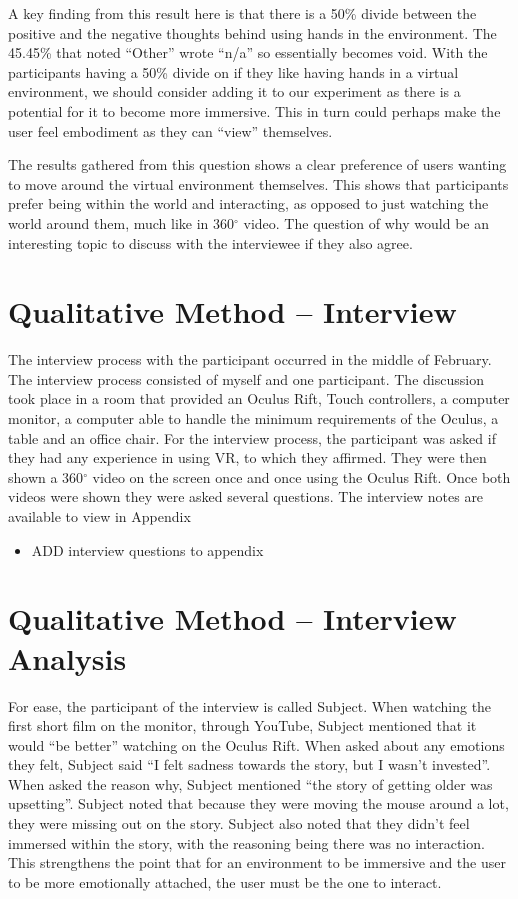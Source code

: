 \documentclass[12pt]{report}
\begin{document}
A key finding from this result here is that there is a 50\% divide between the positive and the negative thoughts behind using hands in the environment. The 45.45\% that noted “Other” wrote “n/a” so essentially becomes void. With the participants having a 50\% divide on if they like having hands in a virtual environment, we should consider adding it to our experiment as there is a potential for it to become more immersive. This in turn could perhaps make the user feel embodiment as they can “view” themselves.


 
 The results gathered from this question shows a clear preference of users wanting to move around the virtual environment themselves. This shows that participants prefer being within the world and interacting, as opposed to just watching the world around them, much like in 360${}^\circ$ video. The question of why would be an interesting topic to discuss with the interviewee if they also agree. 
 
\section{Qualitative Method – Interview} 
The interview process with the participant occurred in the middle of February. The interview process consisted of myself and one participant. The discussion took place in a room that provided an Oculus Rift, Touch controllers, a computer monitor, a computer able to handle the minimum requirements of the Oculus, a table and an office chair. For the interview process, the participant was asked if they had any experience in using VR, to which they affirmed. They were then shown a 360${}^\circ$ video on the screen once and once using the Oculus Rift. Once both videos were shown they were asked several questions. The interview notes are available  to view in Appendix 
 \begin{itemize}
	
	\item ADD interview questions to appendix
\end{itemize} 

\section{Qualitative Method – Interview Analysis}
For ease, the participant of the interview is called Subject.
When watching the first short film on the monitor, through YouTube, Subject mentioned that it would “be better” watching on the Oculus Rift. When asked about any emotions they felt, Subject said “I felt sadness towards the story, but I wasn’t invested”. When asked the reason why, Subject mentioned “the story of getting older was upsetting”. Subject noted that because they were moving the mouse around a lot, they were missing out on the story. Subject also noted that they didn’t feel immersed within the story, with the reasoning being there was no interaction. This strengthens the point that for an environment to be immersive and the user to be more emotionally attached, the user must be the one to interact.  
\end{document}
